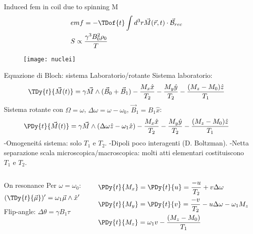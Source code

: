 \begin{frame}{Induced fem in coil due to spinning M}
\begin{align*}
&emf=-\TDof{t}\int d^3r\vec{M}(\vec{r},t)\cdot\vec{\mathcal{B}}_{rec}\\
&S\propto \frac{\gamma^3B_0^2\rho_0}{T}
\end{align*}
\begin{figure}[!ht]\texttt{[image: nuclei]}\label{fig:nuclei}\end{figure}
\end{frame}

\begin{frame}{Equazione di Bloch: sistema Laboratorio/rotante}
Sistema laboratorio:
\begin{equation*}
\TDy{t}{\vec{M}(t)}=\gamma\vec{M}\wedge(\vec{B}_0+\vec{B}_1)-\frac{M_x\hat{x}}{T_2}-\frac{M_y\hat{y}}{T_2}-\frac{(M_z-M_0)\hat{z}}{T_1}
\end{equation*}
Sistema rotante con $\Omega=\omega$, $\Delta\omega=\omega-\omega_0$, $\vec{B}_1=B_1\hat{x}$:
\begin{equation*}
\PDy{t}{\vec{M}(t)}=\gamma\vec{M}\wedge(\Delta\omega\hat{z}-\omega_1\hat{x})-\frac{M_x\hat{x}}{T_2}-\frac{M_y\hat{y}}{T_2}-\frac{(M_z-M_0)\hat{z}}{T_1}
\end{equation*}
-Omogeneit\'a sistema: solo $T_1$ e $T_2$. -Dipoli poco interagenti (D. Boltzman). -Netta separazione scala microscopica/macroscopica: molti atti elementari costituiscono $T_1$ e $T_2$.
\begin{columns}[T]
\begin{column}{0.5\textwidth}
\begin{block}{On resonance}
    Per $\omega=\omega_0$:
\begin{align*}
&(\TDy{t}{\vec{\mu}})'=\omega_1\vec{\mu}\wedge\hat{x}'
\end{align*}
Flip-angle: $\Delta\theta=\gamma B_1\tau$
\end{block}
\end{column}
\begin{column}{0.5\textwidth}
\begin{align*}
&\PDy{t}{M_x}=\PDy{t}{u}=\frac{-u}{T_2}+v\Delta\omega\\
&\PDy{t}{M_y}=\PDy{t}{v}=\frac{-v}{T_2}-u\Delta\omega-\omega_1M_z\\
&\PDy{t}{M_z}=\omega_1 v-\frac{(M_z-M_0)}{T_1}
\end{align*}
\end{column}
\end{columns}
\end{frame}

